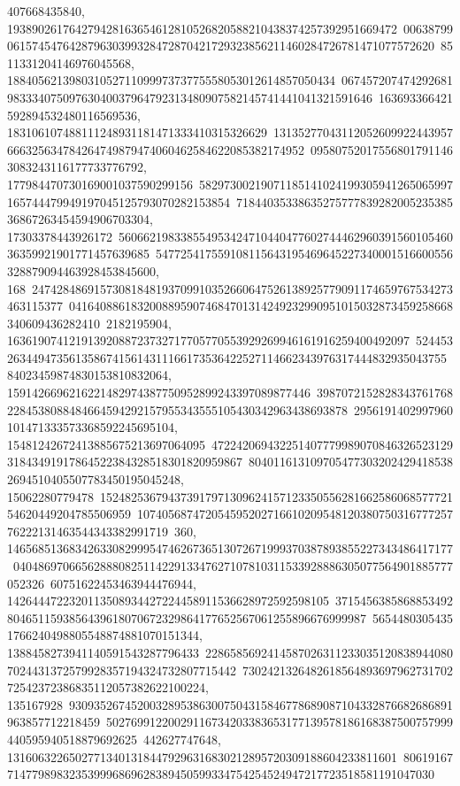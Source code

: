 {{{407668435840, 193890261764279428163654612810526820588210438374257392951669472\
00638799061574547642879630399328472870421729323856211460284726781471077572620\
8511331204146976045568, 18840562139803105271109997373775558053012614857050434\
06745720747429268198333407509763040037964792313480907582145741441041321591646\
163693366421592894532480116569536, 183106107488111248931181471333410315326629\
13135277043112052609922443957666325634784264749879474060462584622085382174952\
095807520175568017911463083243116177733776792, 177984470730169001037590299156\
58297300219071185141024199305941265065997165744479949197045125793070282153854\
7184403533863527577783928200523538536867263454594906703304, 17303378443926172\
56066219833855495342471044047760274446296039156010546036359921901771457639685\
547725417559108115643195469645227340001516600556328879094463928453845600, 168\
24742848691573081848193709910352660647526138925779091174659767534273463115377\
04164088618320088959074684701314249232990951015032873459258668340609436282410\
2182195904, 16361907412191392088723732717705770553929269946161916259400492097\
52445326344947356135867415614311166173536422527114662343976317444832935043755\
84023459874830153810832064, 1591426696216221482974387750952899243397089877446\
39870721528283437617682284538088484664594292157955343555105430342963438693878\
2956191402997960101471333573368592245695104, 15481242672413885675213697064095\
47224206943225140777998907084632652312931843491917864522384328518301820959867\
8040116131097054773032024294185382694510405507783450195045248, 15062280779478\
15248253679437391797130962415712335055628166258606857772154620449204785506959\
10740568747205459520271661020954812038075031677725776222131463544343382991719\
360, 146568513683426330829995474626736513072671999370387893855227343486417177\
04048697066562888082511422913347627107810311533928886305077564901885777052326\
60751622453463944476944, 1426444722320113508934427224458911536628972592598105\
37154563858688534928046511593856439618070672329864177652567061255896676999987\
56544803054351766240498805548874881070151344, 1388458273941140591543287796433\
22865856924145870263112330351208389440807024431372579928357194324732807715442\
730242132648261856489369796273170272542372386835112057382622100224, 135167928\
93093526745200328953863007504315846778689087104332876682686891963857712218459\
50276991220029116734203383653177139578186168387500757999440595940518879692625\
442627747648, 131606322650277134013184479296316830212895720309188604233811601\
80619167714779898323539996869628389450599334754254524947217723518581191047030\
}}}
